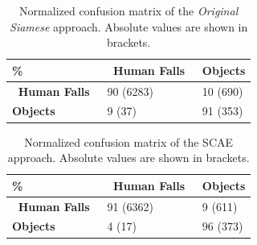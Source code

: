 \begin{table}[t]
	\caption{Normalized confusion matrix of the \textit{Original Siamese} approach. Absolute values are shown in brackets.}
	\label{tab:cm_prai}
	\begin{center}
		\begin{tabular}[t]{C{3cm}|C{3cm}|C{3cm}}	
			
			\hline
			\textbf{\%} & \textbf{$\,$ Human Falls $\,$ } & \textbf{Objects} \\ %
			\hline
			\textbf{$\,$ Human Falls $\,$ }     			& 90 (6283)    &  10 (690)     \\
			\textbf{Objects} 								& 9 (37)   &   91 (353)     	\\
			\hline
		\end{tabular}
	\end{center}
\end{table}
\begin{table}[t]
	\caption{Normalized confusion matrix of the SCAE approach. Absolute values are shown in brackets.}
	\label{tab:cm_scae}
	\begin{center}
		
		\begin{tabular}[t]{C{3cm}|C{3cm}|C{3cm}}
			\hline
			\textbf{\%}                                                    & \textbf{$\,$ Human Falls $\,$ } & \textbf{Objects} \\
			
			\hline
			\textbf{$\,$ Human Falls $\,$ } & 91 (6362)                       & 9 (611)          \\
			\textbf{Objects}                                               & 4 (17)                          & 96 (373)         \\ \hline
		\end{tabular}
	\end{center}
\end{table}